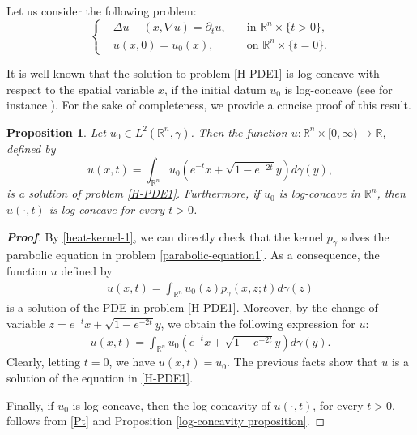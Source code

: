\documentclass[12pt]{amsart}
\newtheorem{proposition}[theorem]{Proposition}
\newcommand{\R}{\mathbb R}
\newcommand{\1}{\mathbf 1}
\begin{document}
Let us consider the following problem:
\begin{equation}\label{H-PDE1}
\left\{
\begin{aligned}
& \Delta u -(x,\nabla u)=\partial_t u, \quad & \mbox{in $\R^n\times \{t>0\}$,}\\
& u(x,0)=u_0(x),  \quad & \mbox{on $\R^n \times \{ t=0 \}$.}
\end{aligned}
\right.
\end{equation}

It is well-known that the solution to problem \eqref{H-PDE1} is log-concave with respect to the spatial variable $x$, if the initial datum $u_0$ is log-concave (see for instance \cite{Book-Markov-Diffu}). For the sake of completeness, we provide a concise proof of this result.

\begin{proposition}
Let $u_0\in L^2(\R^n,\gamma)$. Then the function $u\colon\R^n\times[0,\infty)\to\R$, defined by
\[
u(x,t)=\int_{\R^n} u_0(e^{-t}x+\sqrt{1-e^{-2t}}y) d\gamma(y),
\]
is a solution of problem \eqref{H-PDE1}. Furthermore, if $u_0$ is log-concave in $\R^n$, then $u(\cdot,t)$ is log-concave for every $t>0$.
\end{proposition}

\begin{proof}[\bf Proof]
By \eqref{heat-kernel-1}, we can directly check that the kernel $p_\gamma$ solves the parabolic equation in problem \eqref{parabolic-equation1}. As a consequence, the function $u$ defined by
\begin{equation}\label{Pt}
\begin{aligned}
u(x,t)=\int_{\R^n} u_0(z) p_\gamma(x,z;t) d\gamma(z)
\end{aligned}
\end{equation}
is a solution of the PDE in problem \eqref{H-PDE1}. Moreover, by the change of variable $z=e^{-t}x+\sqrt{1-e^{-2t}}y$, we obtain the following expression for $u$:
\begin{equation}\nonumber
\begin{aligned}
u(x,t)=\int_{\R^n} u_0(e^{-t}x+\sqrt{1-e^{-2t}}y) d\gamma(y).
\end{aligned}
\end{equation}
Clearly, letting $t=0$, we have $u(x,t)=u_0$. The previous facts show that $u$ is a solution of the equation in \eqref{H-PDE1}.

Finally, if $u_0$ is log-concave, then the log-concavity of $u(\cdot,t)$, for every $t>0$, follows from \eqref{Pt} and Proposition \ref{log-concavity proposition}.
\end{proof}
\end{document}
